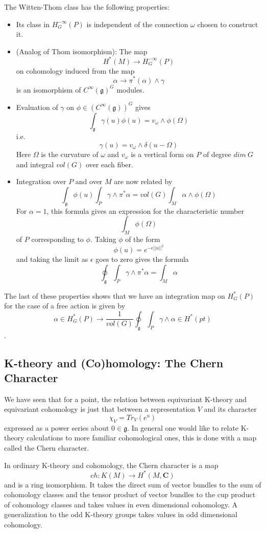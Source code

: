 \documentclass[a4paper,a4paper]{article}
\theoremstyle{conjecture}
\begin{document}
The Witten-Thom class has the following properties:
\begin{itemize}
\item
Its class in $H^{-\infty}_G(P)$ is independent of the connection $\omega$ chosen to construct it.
\item
(Analog of Thom isomorphism): The map
$$ H^*(M)\rightarrow H^{-\infty}_G(P)$$
on cohomology induced from the map
$$\alpha\rightarrow \pi^*(\alpha)\wedge\gamma$$
is an isomorphism of $C^\infty(\mathfrak g)^G$ modules.
\item Evaluation of $\gamma$ on $\phi\in (C^\infty(\mathfrak g))^G$ gives
$$\int_{\mathfrak g} \gamma (u)\phi(u)= v_\omega \wedge \phi(\Omega)$$
i.e.
$$\gamma(u)=v_\omega\wedge\delta(u-\Omega)$$
Here $\Omega$ is the curvature of $\omega$ and $v_\omega$ is a vertical form on
$P$ of degree $dim\ G$ and integral $vol(G)$ over each fiber.
\item
Integration over $P$ and over $M$ are now related by
$$\int_{\mathfrak g}\phi (u)\int_P \gamma\wedge\pi^*\alpha = vol(G)\int_M \alpha\wedge\phi(\Omega)$$
For $\alpha=1$, this formula gives an expression for the characteristic number 
$$\int_M \phi(\Omega)$$
of $P$ corresponding
to $\phi$.  Taking $\phi$ of the form
$$\phi(u)=e^{-\epsilon ||u||^2}$$
and taking the limit as $\epsilon$ goes to zero
gives the formula
$$\oint_{\mathfrak g} \int_P \gamma\wedge\pi^*\alpha = \int_M \alpha$$
\end{itemize}

The last of these properties shows that we have an integration map on $H^*_G(P)$ for the case of a free
action is given by 
$$\alpha\in H^*_G(P) \rightarrow \frac{1}{vol(G)}\oint_{\mathfrak g}\int_P \gamma\wedge\alpha \in H^*(pt)$$.

\subsection{K-theory and (Co)homology: The Chern Character}

We have seen that for a point, the relation between equivariant K-theory and equivariant
cohomology is just that between a representation $V$ and its character
$$\chi_V=Tr_V(e^u)$$
expressed as a power series about $0\in\mathfrak g$.  In general one would like to
relate K-theory calculations to more familiar cohomological ones, this is done with
a map called the Chern character.

In ordinary K-theory and cohomology, the Chern character is a map
$$ch:K(M)\rightarrow H^*(M,\mathbf C)$$
and is a ring isomorphism. It takes the direct sum of vector bundles to the sum
of cohomology classes and the tensor product of vector bundles to the cup product
of cohomology classes and takes values in even dimensional cohomology. A generalization to
the odd K-theory groups takes values in odd dimensional cohomology.  
\end{document}
